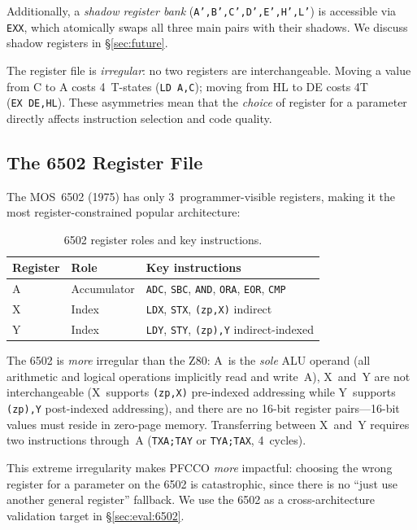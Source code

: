 \documentclass[sigplan,screen,nonacm]{acmart}
\begin{document}
Additionally, a \emph{shadow register bank}
(\texttt{A',B',C',D',E',H',L'}) is accessible via \texttt{EXX}, which
atomically swaps all three main pairs with their shadows.  We discuss
shadow registers in \S\ref{sec:future}.

The register file is \emph{irregular}: no two registers are
interchangeable.  Moving a value from C to A costs 4~T-states
(\texttt{LD~A,C}); moving from HL to DE costs 4T (\texttt{EX~DE,HL}).
These asymmetries mean that the \emph{choice} of register for a parameter
directly affects instruction selection and code quality.

\subsection{The 6502 Register File}
\label{sec:6502regs}

The MOS~6502 (1975) has only 3~programmer-visible registers, making it the
most register-constrained popular architecture:

\begin{table}[h]
\centering\small
\caption{6502 register roles and key instructions.}
\label{tab:6502regs}
\begin{tabular}{@{}lll@{}}
\toprule
Register & Role & Key instructions \\
\midrule
A        & Accumulator   & \texttt{ADC}, \texttt{SBC}, \texttt{AND}, \texttt{ORA}, \texttt{EOR}, \texttt{CMP} \\
X        & Index          & \texttt{LDX}, \texttt{STX}, \texttt{(zp,X)} indirect \\
Y        & Index          & \texttt{LDY}, \texttt{STY}, \texttt{(zp),Y} indirect-indexed \\
\bottomrule
\end{tabular}
\end{table}

The 6502 is \emph{more} irregular than the Z80: A~is the \emph{sole} ALU
operand (all arithmetic and logical operations implicitly read and write~A),
X~and~Y are not interchangeable (X~supports \texttt{(zp,X)} pre-indexed
addressing while Y~supports \texttt{(zp),Y} post-indexed addressing), and
there are no 16-bit register pairs---16-bit values must reside in zero-page
memory.  Transferring between X~and~Y requires two instructions through~A
(\texttt{TXA;TAY} or \texttt{TYA;TAX}, 4~cycles).

This extreme irregularity makes PFCCO \emph{more} impactful: choosing the
wrong register for a parameter on the 6502 is catastrophic, since there is no
``just use another general register'' fallback.  We use the 6502 as a
cross-architecture validation target in \S\ref{sec:eval:6502}.
\end{document}
